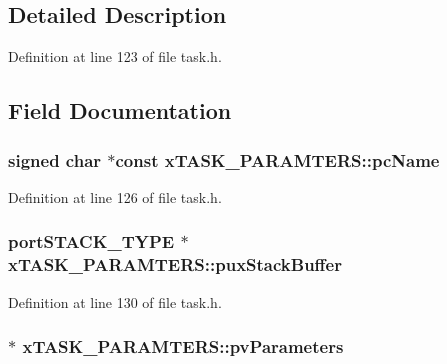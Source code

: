 \subsection{Detailed Description}


Definition at line 123 of file task.\-h.



\subsection{Field Documentation}
\hypertarget{structx_t_a_s_k___p_a_r_a_m_t_e_r_s_a337b9cddfe303eda4b5f0316816b5241}{
\subsubsection[{pc\-Name}]{ signed char $\ast${\bf const} x\-T\-A\-S\-K\-\_\-\-P\-A\-R\-A\-M\-T\-E\-R\-S\-::pc\-Name}}\label{structx_t_a_s_k___p_a_r_a_m_t_e_r_s_a337b9cddfe303eda4b5f0316816b5241}


Definition at line 126 of file task.\-h.

\hypertarget{structx_t_a_s_k___p_a_r_a_m_t_e_r_s_a5cc7bcc51c9c46464d9a322e8acdd2c7}{
\subsubsection[{pux\-Stack\-Buffer}]{\setlength{\rightskip}{0pt plus 5cm}port\-S\-T\-A\-C\-K\-\_\-\-T\-Y\-P\-E $\ast$ x\-T\-A\-S\-K\-\_\-\-P\-A\-R\-A\-M\-T\-E\-R\-S\-::pux\-Stack\-Buffer}}\label{structx_t_a_s_k___p_a_r_a_m_t_e_r_s_a5cc7bcc51c9c46464d9a322e8acdd2c7}


Definition at line 130 of file task.\-h.

\hypertarget{structx_t_a_s_k___p_a_r_a_m_t_e_r_s_ac46c7bb4576e3f4d6ff50d6616233509}{
\subsubsection[{pv\-Parameters}]{ $\ast$ x\-T\-A\-S\-K\-\_\-\-P\-A\-R\-A\-M\-T\-E\-R\-S\-::pv\-Parameters}}\label{structx_t_a_s_k___p_a_r_a_m_t_e_r_s_ac46c7bb4576e3f4d6ff50d6616233509}


